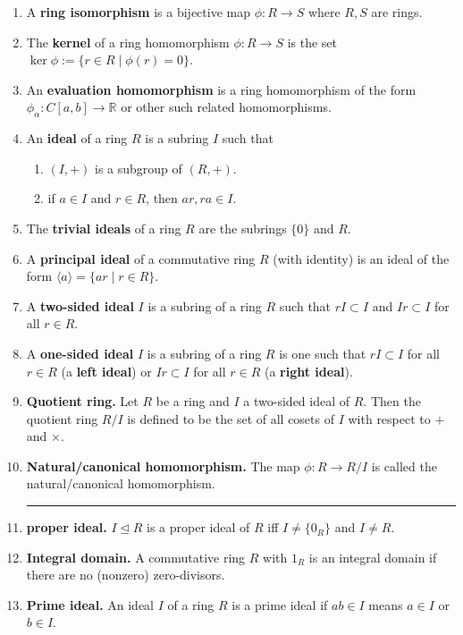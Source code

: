 \begin{enumerate}
        \item A \textbf{ring isomorphism} is a bijective map $\phi: R \to S$ where $R,S$ are rings. 
        \item The \textbf{kernel} of a ring homomorphism $\phi: R \to S$ is the set $\ker\phi := \{r \in R \mid \phi(r) = 0\}$. 
        \item An \textbf{evaluation homomorphism} is a ring homomorphism of the form $\phi_\alpha: C[a,b] \to \mathbb{R}$ or other such related homomorphisms. 
        \item An \textbf{ideal} of a ring $R$ is a subring $I$ such that 
	\begin{enumerate}
	\item $(I,+)$ is a subgroup of $(R,+)$. 
	\item if $a \in I$ and $r \in R$, then $ar,ra \in I$. 
	\end{enumerate}
        \item The \textbf{trivial ideals} of a ring $R$ are the subrings $\{0\}$ and $R$. 
        \item A \textbf{principal ideal} of a commutative ring $R$ (with identity) is an ideal of the form $\langle a \rangle = \{ar \mid r \in R\}$. 
        \item A \textbf{two-sided ideal} $I$ is a subring of a ring $R$ such that $rI \subset I$ and $Ir \subset I$ for all $r \in R$. 
        \item A \textbf{one-sided ideal} $I$ is a subring of a ring $R$ is one such that $rI \subset I$ for all $r \in R$ (a \textbf{left ideal}) or $Ir \subset I$ for all $r \in R$ (a \textbf{right ideal}). 
	\item \textbf{Quotient ring. } Let $R$ be a ring and $I$ a two-sided ideal of $R$. Then the quotient ring $R/I$ is defined to be the set of all cosets of $I$ with respect to $+$ and $\times$. 
	\item \textbf{Natural/canonical homomorphism. } The map $\phi: R \to R/I$ is called the natural/canonical homomorphism. 
	\begin{center}
		\hrule
	\end{center}
	\item \textbf{proper ideal. } $I \unlhd R$ is a proper ideal of $R$ iff $I \neq \{0_R\}$ and $I \neq R$. 
	\item \textbf{Integral domain. } A commutative ring $R$ with $1_R$ is an integral domain if there are no (nonzero) zero-divisors. 
	\item \textbf{Prime ideal. } An ideal $I$ of a ring $R$ is a prime ideal if $ab \in I$ means $a \in I$ or $b \in I$. 

\end{enumerate}
